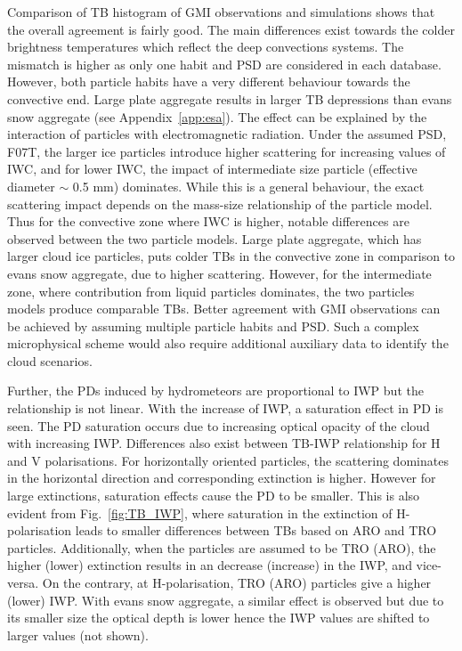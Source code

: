 \documentclass[amt, manuscript]{copernicus}
\begin{document}
 

Comparison of TB histogram of GMI observations and simulations shows that the overall agreement is fairly good. The main differences exist towards the colder brightness temperatures which reflect the deep convections systems. The mismatch is higher as only one habit and PSD are considered in each database. However, both particle habits have a very different behaviour towards the convective end. Large plate aggregate results in larger TB depressions than evans snow aggregate (see Appendix~\ref{app:esa}). The effect can be explained by the interaction of particles with electromagnetic radiation. Under the assumed PSD, F07T, the larger ice particles introduce higher scattering for increasing values of IWC, and for lower IWC, the impact of intermediate size particle (effective diameter $\sim$ 0.5\,\,mm) dominates. While this is a general behaviour, the exact scattering impact depends on the mass-size relationship of the particle model. Thus for the convective zone where IWC is higher, notable differences are observed between the two particle models. Large plate aggregate, which has larger cloud ice particles, puts colder TBs in the convective zone in comparison to evans snow aggregate, due to higher scattering. However, for the intermediate zone, where contribution from liquid particles dominates, the two particles models produce comparable TBs. Better agreement with GMI observations can be achieved by assuming multiple particle habits and PSD. Such a complex microphysical scheme would also require additional auxiliary data to identify the cloud scenarios.  

Further, the PDs induced by hydrometeors are proportional to IWP but the relationship is not linear. With the increase of IWP, a saturation effect in PD is seen. The PD saturation occurs due to increasing optical opacity of the cloud with increasing IWP. Differences also exist between TB-IWP relationship for H and V polarisations. For horizontally oriented particles, the scattering dominates in the horizontal direction and corresponding extinction is higher. However for large extinctions, saturation effects cause the PD to be smaller. This is also evident from Fig.~\ref{fig:TB_IWP}, where saturation in the extinction of H- polarisation leads to smaller differences between TBs based on ARO and TRO particles. Additionally, when the particles are assumed to be TRO (ARO), the higher (lower) extinction results in an decrease (increase) in the IWP, and vice-versa. On the contrary, at H-polarisation, TRO (ARO) particles give a higher (lower) IWP. With evans snow aggregate, a similar effect is observed but due to its smaller size the optical depth is lower hence the IWP values are shifted to larger values (not shown).
\end{document}
